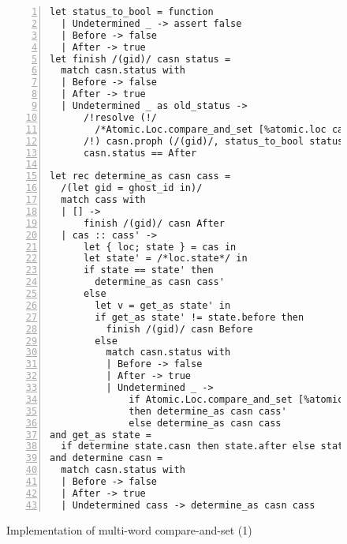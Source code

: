 \begin{figure}[tp]
\begin{lstlisting}[numbers=left]
let status_to_bool = function
  | Undetermined _ -> assert false
  | Before -> false
  | After -> true
let finish /(gid)/ casn status =
  match casn.status with
  | Before -> false
  | After -> true
  | Undetermined _ as old_status ->
      /!resolve (!/
        /*Atomic.Loc.compare_and_set [%atomic.loc casn.status] old_status status*/
      /!) casn.proph (/(gid)/, status_to_bool status) |> ignore!/ ;
      casn.status == After

let rec determine_as casn cass =
  /(let gid = ghost_id in)/
  match cass with
  | [] ->
      finish /(gid)/ casn After
  | cas :: cass' ->
      let { loc; state } = cas in
      let state' = /*loc.state*/ in
      if state == state' then
        determine_as casn cass'
      else
        let v = get_as state' in
        if get_as state' != state.before then
          finish /(gid)/ casn Before
        else
          match casn.status with
          | Before -> false
          | After -> true
          | Undetermined _ ->
              if Atomic.Loc.compare_and_set [%atomic.loc loc.state] state' state
              then determine_as casn cass'
              else determine_as casn cass
and get_as state =
  if determine state.casn then state.after else state.before
and determine casn =
  match casn.status with
  | Before -> false
  | After -> true
  | Undetermined cass -> determine_as casn cass
\end{lstlisting}
\caption{Implementation of multi-word compare-and-set (1)}
\label{fig:mcas}
\end{figure}